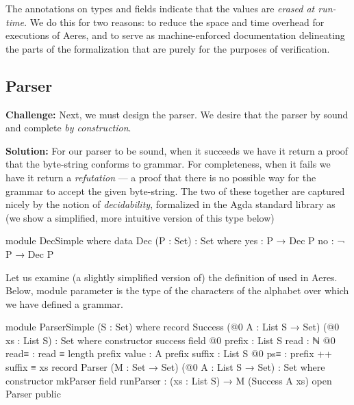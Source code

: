 \documentclass[11pt]{article}
\begin{document}
The  annotations on types and fields indicate that
the values are \emph{erased at run-time.}
We do this for two reasons: to reduce the space and time overhead for
executions of Aeres, and to serve as machine-enforced documentation
delineating the parts of the formalization that are purely for the purposes of
verification.
\subsection{Parser}
\label{sec:org2821fe9}

\textbf{Challenge:} Next, we must design the parser.
We desire that the parser by sound and complete \emph{by construction}.

\textbf{Solution:} For our parser to be sound, when it succeeds we have it return a
proof that the byte-string conforms to grammar. For completeness, when it
fails we have it return a \emph{refutation} --- a proof that there is no possible
way for the grammar to accept the given byte-string.
The two of these together are captured nicely by the notion of
\emph{decidability}, formalized in the Agda standard library as 
(we show a simplified, more intuitive version of this type below)
\begin{code}
module DecSimple where
  data Dec (P : Set) : Set where
    yes : P → Dec P
    no  : ¬ P → Dec P
\end{code}

Let us examine (a slightly simplified version of) the definition of
 used in Aeres.
Below, module parameter  is the type of the characters of the
alphabet over which we have defined a grammar.

\begin{code}
module ParserSimple (S : Set) where
  record Success (@0 A : List S → Set) (@0 xs : List S) : Set where
    constructor success
    field
      @0 prefix : List S
      read   : ℕ
      @0 read≡ : read ≡ length prefix
      value  : A prefix
      suffix : List S
      @0 ps≡    : prefix ++ suffix ≡ xs
  record Parser (M : Set → Set) (@0 A : List S → Set) : Set where
    constructor mkParser
    field
      runParser : (xs : List S) → M (Success A xs)
  open Parser public
\end{code}
\end{document}
